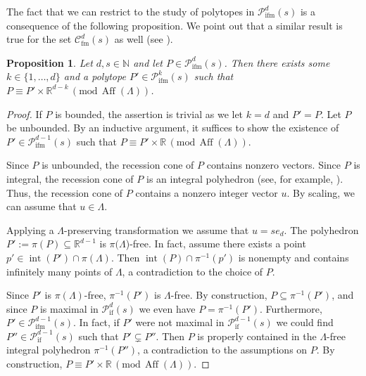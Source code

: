 \documentclass[a4paper]{article}
\theoremstyle{plain}
\newtheorem{proposition}[nn]{Proposition}
\begin{document}
The fact that we can restrict to the study of polytopes in
${{\mathcal{P}}_{{\mathop{\mathrm{{ifm}}}}}^{{d}}({s})}$ is a consequence of the following
proposition.
We point out that a similar result is true for the set
${{\mathcal{C}}_{{\mathop{\mathrm{{fm}}}}}^{{d}}({s})}$  as well (see
\cite[Proposition\,3.1]{Lovasz89}).

\begin{proposition} \label{S=P+L} \label{unbounded lat-free}
Let $d,s \in {\mathbb{N}}$ and let $P \in {{\mathcal{P}}_{{\mathop{\mathrm{{ifm}}}}}^{{d}}({s})}$.
Then there exists some $k \in \{1, \ldots, d\}$ and a
polytope $P' \in{{\mathcal{P}}_{{\mathop{\mathrm{{ifm}}}}}^{{k}}({s})}$ such that $P \equiv P' \times
{\mathbb{R}}^{d-k} {\, (\mathrm{mod} \, {{{\mathop{\mathrm{{Aff}}}}}(\Lambda)})}$.
\end{proposition}

\begin{proof}
If $P$ is bounded, the assertion is trivial as we let
$k = d$ and $P' = P$.
Let $P$ be unbounded.
By an inductive argument, it suffices to show the existence
of $P' \in {{\mathcal{P}}_{{\mathop{\mathrm{{ifm}}}}}^{{d-1}}({s})}$ such that $P \equiv P' \times
{\mathbb{R}} {\, (\mathrm{mod} \, {{{\mathop{\mathrm{{Aff}}}}}(\Lambda)})}$.

Since $P$ is unbounded, the recession cone of $P$ contains
nonzero vectors.
Since $P$ is integral, the recession cone of $P$ is an
integral polyhedron (see, for example,
\cite[\S16.2]{schrijver-book-86}).
Thus, the recession cone of $P$ contains a nonzero integer
vector $u$.
By scaling, we can assume that $u \in \Lambda$.
		
Applying a $\Lambda$-preserving transformation we assume
that $u = s e_d$.
The polyhedron $P' := \pi(P) \subseteq {\mathbb{R}}^{d-1}$ is
$\pi(\Lambda$)-free.
In fact, assume there exists a point $p' \in {{\mathop{\mathrm{{int}}}}}(P') \cap
\pi(\Lambda)$.
Then ${{\mathop{\mathrm{{int}}}}}(P) \cap \pi^{-1}(p')$ is nonempty and contains
infinitely many points of $\Lambda$, a contradiction to the
choice of $P$.

Since $P'$ is $\pi(\Lambda)$-free, $\pi^{-1}(P')$ is
$\Lambda$-free.
By construction, $P \subseteq \pi^{-1}(P')$, and since $P$
is maximal in ${{\mathcal{P}}_{{\mathop{\mathrm{{if}}}}}^{{d}}({s})}$ we even have $P=\pi^{-1}(P')$.
Furthermore, $P' \in {{\mathcal{P}}_{{\mathop{\mathrm{{ifm}}}}}^{{d-1}}({s})}$.
In fact, if $P'$ were not maximal in ${{\mathcal{P}}_{{\mathop{\mathrm{{if}}}}}^{{d-1}}({s})}$ we
could find $P'' \in {{\mathcal{P}}_{{\mathop{\mathrm{{if}}}}}^{{d-1}}({s})}$ such that $P'
\varsubsetneq P''$.
Then $P$ is properly contained in the $\Lambda$-free
integral polyhedron $\pi^{-1}(P'')$, a contradiction to the
assumptions on $P$.
By construction, $P \equiv P' \times {\mathbb{R}}
{\, (\mathrm{mod} \, {{{\mathop{\mathrm{{Aff}}}}}(\Lambda)})}$.
\end{proof}
\end{document}
